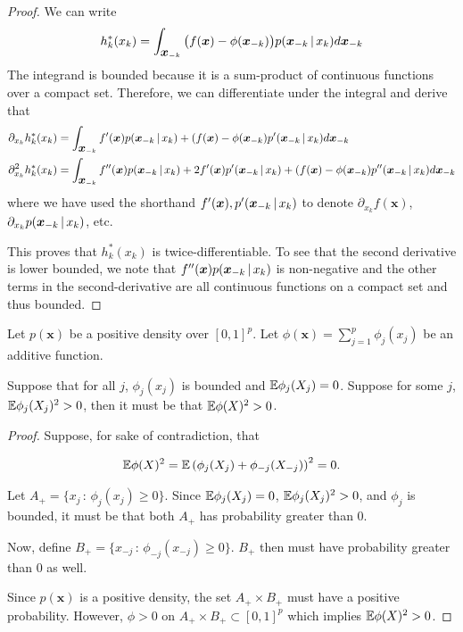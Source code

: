 \begin{proof}
We can write
\[
h^*_k(x_k) = \int_{\mbox{\boldmath $x$}_{-k}} \big(f(\mbox{\boldmath $x$}) - \phi(\mbox{\boldmath $x$}_{-k})\big) p(\mbox{\boldmath $x$}_{-k} {\,|\,} x_k) d \mbox{\boldmath $x$}_{-k}
\]
The integrand is bounded because it is a sum-product of continuous functions over a compact set. Therefore, we can differentiate under the integral and derive that
\begin{align*}
\partial_{x_k} h^*_k(x_k) &= 
    \int_{\mbox{\boldmath $x$}_{-k}} f'(\mbox{\boldmath $x$}) p(\mbox{\boldmath $x$}_{-k} {\,|\,} x_k) + (f(\mbox{\boldmath $x$}) - \phi(\mbox{\boldmath $x$}_{-k}) p'(\mbox{\boldmath $x$}_{-k} {\,|\,} x_k) d \mbox{\boldmath $x$}_{-k}\\
\partial_{x_k}^2 h^*_k(x_k) &= 
    \int_{\mbox{\boldmath $x$}_{-k}} f''(\mbox{\boldmath $x$}) p(\mbox{\boldmath $x$}_{-k} {\,|\,} x_k) + 2f'(\mbox{\boldmath $x$}) p'(\mbox{\boldmath $x$}_{-k} {\,|\,} x_k)  + (f(\mbox{\boldmath $x$}) - \phi(\mbox{\boldmath $x$}_{-k}) p''(\mbox{\boldmath $x$}_{-k} {\,|\,} x_k) d \mbox{\boldmath $x$}_{-k}
\end{align*}
where we have used the shorthand $f'(\mbox{\boldmath $x$}), p'(\mbox{\boldmath $x$}_{-k}
{\,|\,} x_k)$ to denote $\partial_{x_k} f(\mathbf{x})$, $\partial_{x_k}
p(\mbox{\boldmath $x$}_{-k} {\,|\,} x_k)$, etc.

This proves that $h^*_k(x_k)$ is twice-differentiable. To see that the second derivative is lower bounded, we note that $f''(\mbox{\boldmath $x$}) p(\mbox{\boldmath $x$}_{-k} {\,|\,} x_k)$ is non-negative and the other terms in the second-derivative are all continuous functions on a compact set and thus bounded. 
\end{proof}

 
\begin{lemma}
\label{lem:additive_uniqueness}
Let $p(\mathbf{x})$ be a positive density over $[0,1]^p$. Let $\phi(\mathbf{x}) = \sum_{j=1}^p \phi_j(x_j)$ be an additive function.

Suppose that for all $j$, $\phi_j(x_j)$ is bounded and ${\mathbb E} \phi_j(X_j) = 0$. Suppose for some $j$, ${\mathbb E} \phi_j(X_j)^2 > 0$, then it must be that ${\mathbb E} \phi(X)^2 > 0$. 
\end{lemma}

\begin{proof}

Suppose, for sake of contradiction, that

\begin{align*}
{\mathbb E} \phi(X)^2 = {\mathbb E} \left( \phi_j(X_j) + \phi_{-j} (X_{-j}) \right)^2 = 0.
\end{align*}

Let $A_+ = \{ x_j \,:\, \phi_j(x_j) \geq 0 \}$. Since ${\mathbb E} \phi_j(X_j) = 0$, ${\mathbb E} \phi_j(X_j)^2 > 0$, and $\phi_j$ is bounded, it must be that both $A_+$ has probability greater than 0.

Now, define $B_+ = \{ x_{-j} \,:\, \phi_{-j}(x_{-j}) \geq 0 \}$. $B_+$ then must have probability greater than 0 as well. 

Since $p(\mathbf{x})$ is a positive density, the set $A_+ \times B_+$ must have a positive probability. However, $\phi > 0$ on $A_+ \times B_+ \subset [0,1]^p$ which implies ${\mathbb E} \phi(X)^2 > 0$.

\end{proof}

